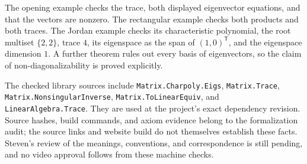 The opening example checks the trace, both displayed eigenvector equations, and that the vectors are nonzero. The rectangular example checks both products and both traces. The Jordan example checks its characteristic polynomial, the root multiset $\{2,2\}$, trace $4$, its eigenspace as the span of $(1,0)^{\mathsf{T}}$, and the eigenspace dimension $1$. A further theorem rules out every basis of eigenvectors, so the claim of non-diagonalizability is proved explicitly.

The checked library sources include \texttt{Matrix.Charpoly.Eigs}, \texttt{Matrix.Trace}, \texttt{Matrix.NonsingularInverse}, \texttt{Matrix.ToLinearEquiv}, and \texttt{LinearAlgebra.Trace}. They are used at the project's exact dependency revision. Source hashes, build commands, and axiom evidence belong to the formalization audit; the source links and website build do not themselves establish these facts. Steven's review of the meanings, conventions, and correspondence is still pending, and no video approval follows from these machine checks.
